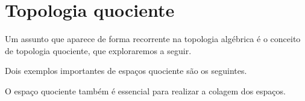 \section{Topologia quociente}
\label{topologia-quociente}
Um assunto que aparece de forma recorrente na topologia algébrica é o conceito de topologia quociente, que exploraremos a seguir. 


Dois exemplos importantes de espaços quociente são os seguintes.


O espaço quociente também é essencial para realizar a colagem dos espaços.




